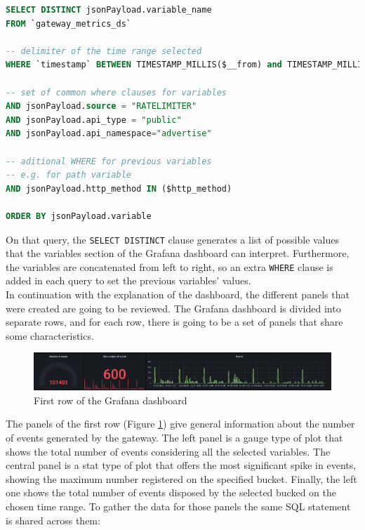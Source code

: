\documentclass[english, 12pt, a4paper, sci, utf8, a-1b, online]{aaltothesis}
\begin{document}
\begin{lstlisting}[language=sql,firstnumber=1]
SELECT DISTINCT jsonPayload.variable_name
FROM `gateway_metrics_ds`

-- delimiter of the time range selected
WHERE `timestamp` BETWEEN TIMESTAMP_MILLIS($__from) and TIMESTAMP_MILLIS($__to)
  
-- set of common where clauses for variables
AND jsonPayload.source = "RATELIMITER"
AND jsonPayload.api_type = "public"
AND jsonPayload.api_namespace="advertise"

-- aditional WHERE for previous variables
-- e.g. for path variable
AND jsonPayload.http_method IN ($http_method)

ORDER BY jsonPayload.variable
\end{lstlisting}

On that query, the \texttt{SELECT DISTINCT} clause generates a list of possible values that the variables section of the Grafana dashboard can interpret. Furthermore, the variables are concatenated from left to right, so an extra \texttt{WHERE} clause is added in each query to set the previous variables' values.\\

In continuation with the explanation of the dashboard, the different panels that were created are going to be reviewed. The Grafana dashboard is divided into separate rows, and for each row, there is going to be a set of panels that share some characteristics.

\begin{figure}[h]
    \centering
    \includegraphics[scale=0.24]{src/thesis/img/technical-solution/grafana-dashboard/row-1.png}
    \caption{First row of the Grafana dashboard}
    \label{fig:grafana-row-1}
\end{figure}

The panels of the first row (Figure \ref{fig:grafana-row-1}) give general information about the number of events generated by the gateway. The left panel is a gauge type of plot that shows the total number of events considering all the selected variables. The central panel is a stat type of plot that offers the most significant spike in events, showing the maximum number registered on the specified bucket. Finally, the left one shows the total number of events disposed by the selected bucked on the chosen time range. To gather the data for those panels the same SQL statement is shared across them:\\
\end{document}
